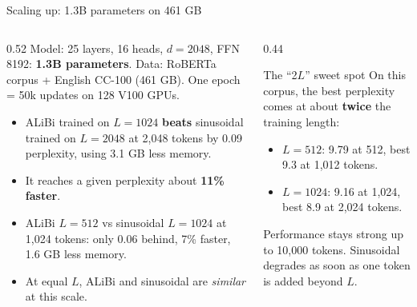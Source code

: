 \documentclass[aspectratio=169,11pt]{beamer}
\begin{document}
\begin{frame}{Scaling up: 1.3B parameters on 461 GB}
  \begin{columns}[T]
    \begin{column}{0.52\textwidth}
      \small
      Model: 25 layers, 16 heads, $d=2048$, FFN 8192: \textbf{1.3B parameters}. Data: RoBERTa corpus + English CC-100 (461 GB). One epoch = 50k updates on 128 V100 GPUs.
      \vspace{1mm}

      \begin{itemize}
        \item ALiBi trained on $L=1024$ \textbf{beats} sinusoidal trained on $L=2048$ at 2,048 tokens by 0.09 perplexity, using 3.1 GB less memory.
        \item It reaches a given perplexity about \textbf{11\% faster}.
        \item ALiBi $L=512$ vs sinusoidal $L=1024$ at 1,024 tokens: only 0.06 behind, 7\% faster, 1.6 GB less memory.
        \item At equal $L$, ALiBi and sinusoidal are \emph{similar} at this scale.
      \end{itemize}
    \end{column}
    \begin{column}{0.44\textwidth}
      \begin{exampleblock}{The ``2$L$'' sweet spot}
        \small
        On this corpus, the best perplexity comes at about \textbf{twice} the training length:
        \begin{itemize}
          \item $L=512$: 9.79 at 512, best 9.3 at 1,012 tokens.
          \item $L=1024$: 9.16 at 1,024, best 8.9 at 2,024 tokens.
        \end{itemize}
        Performance stays strong up to 10,000 tokens. Sinusoidal degrades as soon as one token is added beyond $L$.
      \end{exampleblock}
    \end{column}
  \end{columns}
\end{frame}
\end{document}
